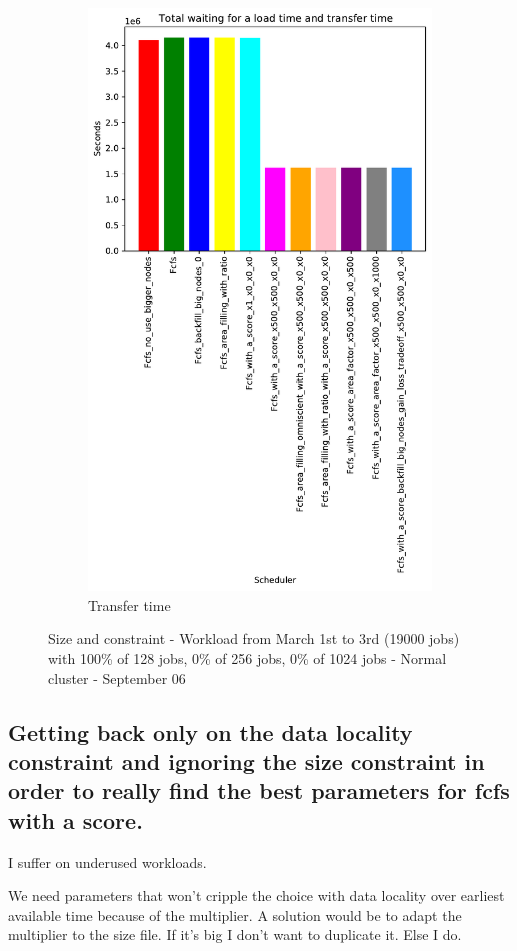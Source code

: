 \documentclass[a4paper]{article}
\begin{document}
\begin{figure}[H]
\begin{subfigure}[b]{0.4\linewidth}\centering\includegraphics[width=0.7\linewidth]{MBSS/plot/Results_Size_And_Data_2022-03-01->2022-03-03_V10000_Total_waiting_for_a_load_time_and_transfer_time_450_128_32_256_4_1024.pdf}\caption{Transfer time}\label{45}\end{subfigure}
\caption{Size and constraint - Workload from March 1st to 3rd (19000 jobs) with 100\% of 128 jobs, 0\% of 256 jobs, 0\% of 1024 jobs - Normal cluster - September 06}\label{49}\end{figure}

\subsection{Getting back only on the data locality constraint and ignoring the size constraint in order to really find the best parameters for fcfs with a score.}

I suffer on underused workloads.

We need parameters that won't cripple the choice with data locality over earliest available time because of the multiplier.
A solution would be to adapt the multiplier to the size file. If it's big I don't want to duplicate it. Else I do. 
\end{document}
